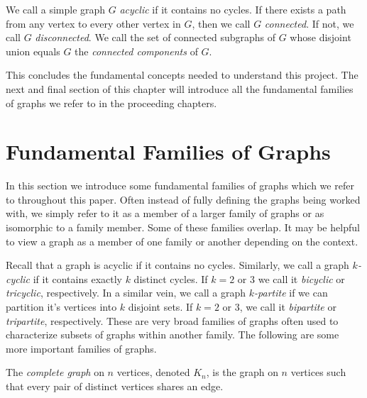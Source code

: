 We call a simple graph $G$ \textit{acyclic} if it contains no cycles. If there exists a path from any vertex to every other vertex in $G$, then we call $G$ \textit{connected}. If not, we call $G$ \textit{disconnected}. We call the set of connected subgraphs of $G$ whose disjoint union equals $G$ the \textit{connected components} of $G$.

This concludes the fundamental concepts needed to understand this project. The next and final section of this chapter will introduce all the fundamental families of graphs we refer to in the proceeding chapters.

\section{Fundamental Families of Graphs}

In this section we introduce some fundamental families of graphs which we refer to throughout this paper. Often instead of fully defining the graphs being worked with, we simply refer to it as a member of a larger family of graphs or as isomorphic to a family member. Some of these families overlap. It may be helpful to view a graph as a member of one family or another depending on the context. 

Recall that a graph is acyclic if it contains no cycles. Similarly, we call a graph \textit{$k$-cyclic} if it contains exactly $k$ distinct cycles. If $k=2\text{ or }3$ we call it \textit{bicyclic} or \textit{tricyclic}, respectively. In a similar vein, we call a graph \textit{$k$-partite} if we can partition it's vertices into $k$ disjoint sets. If $k=2\text{ or }3$, we call it \textit{bipartite} or \textit{tripartite}, respectively. These are very broad families of graphs often used to characterize subsets of graphs within another family. The following are some more important families of graphs.

\begin{definition}
    The \textit{complete graph} on $n$ vertices, denoted $K_n$, is the
    graph on $n$ vertices such that every pair of distinct vertices shares an edge.
\end{definition}

